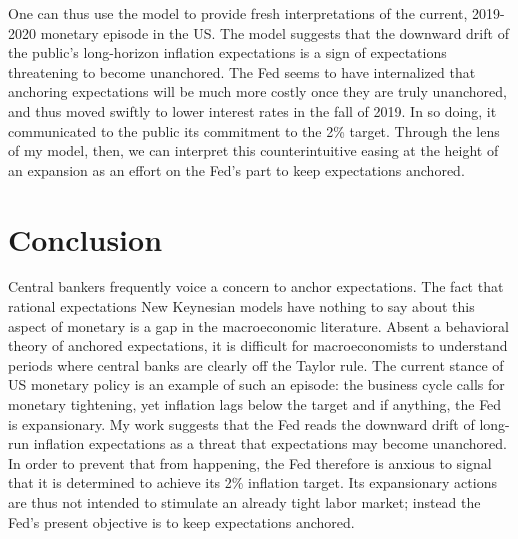 \documentclass[11pt]{article}
\def \myBibPath {../../literature/}
\renewcommand{\[}{\begin{equation}}
\renewcommand{\]}{\end{equation}}
\begin{document}
One can thus use the model to provide fresh interpretations of the current, 2019-2020 monetary episode in the US. The model suggests that the downward drift of the public's long-horizon inflation expectations is a sign of expectations threatening to become unanchored. The Fed seems to have internalized that anchoring expectations will be much more costly once they are truly unanchored, and thus moved swiftly to lower interest rates in the fall of 2019. In so doing, it communicated to the public its commitment to the 2\% target. Through the lens of my model, then, we can interpret this counterintuitive easing at the height of an expansion as an effort on the Fed's part to keep expectations anchored. 






\section{Conclusion}\label{conclusion}
Central bankers frequently voice a concern to anchor expectations. The fact that rational expectations New Keynesian models have nothing to say about this aspect of monetary is a gap in the macroeconomic literature. Absent a behavioral theory of anchored expectations, it is difficult for macroeconomists to understand periods where central banks are clearly off the Taylor rule. The current stance of US monetary policy is an example of such an episode: the business cycle calls for monetary tightening, yet inflation lags below the target and if anything, the Fed is expansionary. My work suggests that the Fed reads the downward drift of long-run inflation expectations as a threat that expectations may become unanchored. In order to prevent that from happening, the Fed therefore is anxious to signal that it is determined to achieve its 2\% inflation target. Its expansionary actions are thus not intended to stimulate an already tight labor market; instead the Fed's present objective is to keep expectations anchored. 


\clearpage
\newpage

%


\newpage
\appendix
\end{document}
